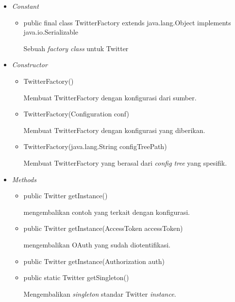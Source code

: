 	\begin{itemize}
		\item \textit{Constant}
		
		\begin{itemize}
			\item public final class TwitterFactory
			extends java.lang.Object
			implements java.io.Serializable
			
			Sebuah \textit{factory class} untuk Twitter
		\end{itemize}
		\item \textit{Constructor}
		
		\begin{itemize}
			\item TwitterFactory()
			
			Membuat TwitterFactory dengan konfigurasi dari sumber.
			\item TwitterFactory(Configuration conf)
			
			Membuat TwitterFactory dengan konfigurasi yang diberikan.
			\item TwitterFactory(java.lang.String configTreePath)
			
			Membuat TwitterFactory yang berasal dari \textit{config tree} yang spesifik.
		\end{itemize}
		\item \textit{Methods}
		
		\begin{itemize}
			\item public Twitter getInstance()
			
			mengembalikan contoh yang terkait dengan konfigurasi.
			\item public Twitter getInstance(AccessToken accessToken)
			
			mengembalikan OAuth yang sudah diotentifikasi.
			\item public Twitter getInstance(Authorization auth)
			\item public static Twitter getSingleton()
			
			Mengembalikan \textit{singleton} standar Twitter \textit{instance}.
		\end{itemize}
	\end{itemize}
	
	
